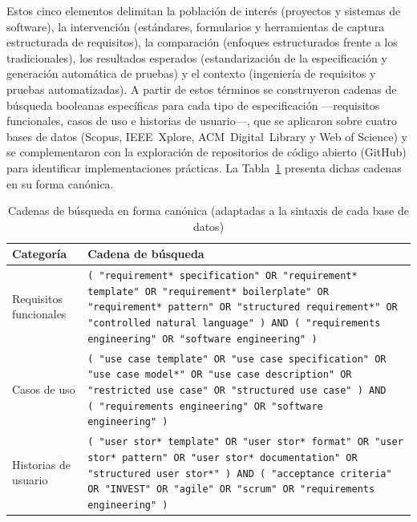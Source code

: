 \documentclass[10pt,journal,twoside,letterpaper]{IEEEtran}
\begin{document}
    Estos cinco elementos delimitan la población de interés (proyectos y sistemas de software), la intervención (estándares, formularios y herramientas de captura estructurada de requisitos), la comparación (enfoques estructurados frente a los tradicionales), los resultados esperados (estandarización de la especificación y generación automática de pruebas) y el contexto (ingeniería de requisitos y pruebas automatizadas). A partir de estos términos se construyeron cadenas de búsqueda booleanas específicas para cada tipo de especificación ---requisitos funcionales, casos de uso e historias de usuario---, que se aplicaron sobre cuatro bases de datos (Scopus, IEEE~Xplore, ACM~Digital~Library y Web of Science) y se complementaron con la exploración de repositorios de código abierto (GitHub) para identificar implementaciones prácticas. La Tabla~\ref{tab:cadenas} presenta dichas cadenas en su forma canónica.
    
    \begin{table}[!tb]
        \caption{Cadenas de búsqueda en forma canónica (adaptadas a la sintaxis de cada base de datos)}
        \label{tab:cadenas}
        \centering
        \footnotesize
        \begin{tabular}{@{}p{}p{}@{}}
            \toprule
            \textbf{Categoría} & \textbf{Cadena de búsqueda} \\
            \midrule
            Requisitos funcionales & \texttt{(\,"requirement* specification" OR "requirement* template" OR "requirement* boilerplate" OR "requirement* pattern" OR "structured requirement*" OR "controlled natural language"\,) AND (\,"requirements engineering" OR "software engineering"\,)} \\
            \addlinespace
            Casos de uso & \texttt{(\,"use case template" OR "use case specification" OR "use case model*" OR "use case description" OR "restricted use case" OR "structured use case"\,) AND (\,"requirements engineering" OR "software engineering"\,)} \\
            \addlinespace
            Historias de usuario & \texttt{(\,"user stor* template" OR "user stor* format" OR "user stor* pattern" OR "user stor* documentation" OR "structured user stor*"\,) AND (\,"acceptance criteria" OR "INVEST" OR "agile" OR "scrum" OR "requirements engineering"\,)} \\
            \bottomrule
        \end{tabular}
    \end{table}
    
\end{document}
